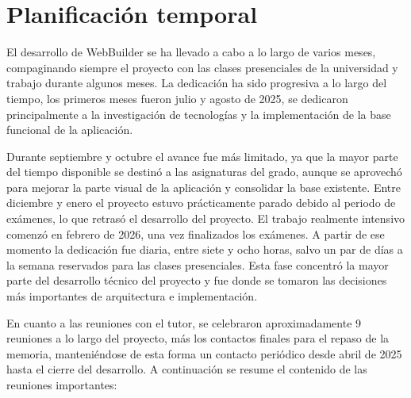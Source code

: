 \section{Planificación temporal}
\label{sec:planificacion-temporal}

El desarrollo de WebBuilder se ha llevado a cabo a lo largo de varios meses, compaginando siempre el proyecto con las clases presenciales de la universidad y trabajo durante algunos meses. La dedicación ha sido progresiva a lo largo del tiempo, los primeros meses fueron julio y agosto de 2025, se dedicaron principalmente a la investigación de tecnologías y la implementación de la base funcional de la aplicación. 

Durante septiembre y octubre el avance fue más limitado, ya que la mayor parte del tiempo disponible se destinó a las asignaturas del grado, aunque se aprovechó para mejorar la parte visual de la aplicación y consolidar la base existente. Entre diciembre y enero el proyecto estuvo prácticamente parado debido al periodo de exámenes, lo que retrasó el desarrollo del proyecto. El trabajo realmente intensivo comenzó en febrero de 2026, una vez finalizados los exámenes. A partir de ese momento la dedicación fue diaria, entre siete y ocho horas, salvo un par de días a la semana reservados para las clases presenciales. Esta fase concentró la mayor parte del desarrollo técnico del proyecto y fue donde se tomaron las decisiones más importantes de arquitectura e implementación.

En cuanto a las reuniones con el tutor, se celebraron aproximadamente 9 reuniones a lo largo del proyecto, más los contactos finales para el repaso de la memoria,  manteniéndose de esta forma un contacto periódico desde abril de 2025 hasta el cierre del desarrollo. A continuación se resume el contenido de las reuniones importantes:

